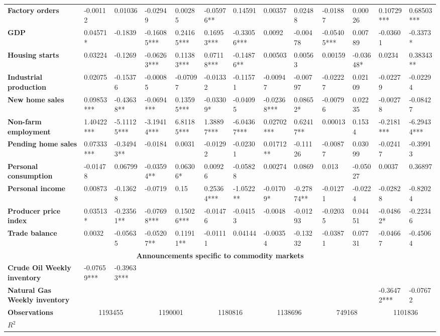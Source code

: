 \begin{sidewaystable}
{\begin{tabular}{@{}lllllllllllll@{}}
\\ \textbf{Factory orders}& -0.00112 & 0.01036 & -0.02949 & 0.00285 & -0.05976** & 0.14591 & 0.00357 & 0.02488 & -0.01887 & 0.00026 & 0.10729*** & 0.68503*** \\ \textbf{GDP}& 0.04571* & -0.1839 & -0.16085*** & 0.24165*** & 0.16953***& -0.33056***& 0.0092 & -0.00478 & -0.05405*** & 0.00789 & -0.03601 & -0.3373* \\ \textbf{Housing starts}& 0.03224 & -0.1269 & -0.06263*** & 0.11383*** & 0.07118***& -0.14876**& 0.00503 & 0.00563 & 0.00159 & -0.03648* & 0.0234 & 0.38343** \\ \textbf{Industrial production}& 0.02075 & -0.15376 & -0.00085 & -0.07097 & -0.01332 & -0.11571 & -0.00947 & -0.00797 & -0.02227 & 0.02109 & -0.02279 & -0.02294 \\ \textbf{New home sales}& 0.09853*** & -0.43638** & -0.0694*** & 0.13595*** & -0.03309* & -0.04095 & -0.02368*** & 0.08652* & -0.00796 & 0.02235 & -0.00278 & -0.08427 \\ \textbf{Non-farm employment}& 1.40422*** & -5.11125*** & -3.19414*** & 6.81185*** & 1.38897***& -6.04367***& 0.02702*** & 0.62417** & 0.00013 & 0.1534 & -0.2181*** & -6.29434*** \\ \textbf{Pending home sales}& 0.07333*** & -0.34943** & -0.0184 & 0.0031 & -0.01292 & -0.02301 & 0.01712** & -0.11126 & -0.00877 & 0.03099 & -0.02417 & -0.39913 \\ \textbf{Personal consumption}& -0.01478 & 0.06799 & -0.03594** & 0.06306* & 0.00926 & -0.05828 & 0.00274 & 0.0869 & 0.013 & -0.05027 & 0.0037 & 0.36897 \\ \textbf{Personal income}& 0.00873 & -0.13628 & -0.0719 & 0.15 & 0.25364***& -1.0522**& -0.01709* & -0.27874** & -0.01271 & -0.0224 & -0.02828 & -0.82024 \\ \textbf{Producer price index}& 0.03513* & -0.23561** & -0.07698*** & 0.15026*** & -0.01476 & -0.04153 & -0.0048 & -0.01293 & -0.02035 & 0.04451 & -0.04862* & -0.22346 \\ \textbf{Trade balance}& 0.0032 & -0.05635 & -0.05207** & 0.11911** & -0.01111 & 0.04144 & -0.00354 & -0.13232 & -0.03871 & 0.07731 & -0.04667 & -0.45064 \\  \midrule \multicolumn{13}{c}{\textbf{Announcements specific to commodity markets}} \\ \midrule \textbf{Crude Oil Weekly inventory}& -0.07659*** & -0.39633*** &  &  &  &  &  &  &  &  &  &  \\ \textbf{Natural Gas Weekly inventory}&  &  &  &  &  &  &  &  &  &  & -0.36472*** & -0.07672 \\  \midrule \textbf{Observations}             &\multicolumn{2}{c}{ 1193455 }                                                 & \multicolumn{2}{c}{ 1190001 }                                                 & \multicolumn{2}{c}{ 1180816 }                                                 & \multicolumn{2}{c}{ 1138696 }                                                 & \multicolumn{2}{c}{ 749168 }                                                   & \multicolumn{2}{c}{ 1101836 }                                                 \\ \textbf{$R^2$}            
\end{tabular}}
\end{sidewaystable}
